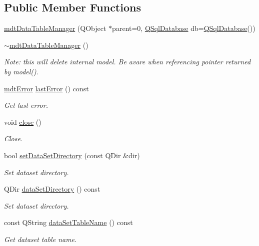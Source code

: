 \subsection*{Public Member Functions}
\begin{DoxyCompactItemize}
\item 
\hyperlink{classmdt_data_table_manager_ae63e559f597ae48a36e149afde3a8396}{mdt\-Data\-Table\-Manager} (Q\-Object $\ast$parent=0, \hyperlink{class_q_sql_database}{Q\-Sql\-Database} db=\hyperlink{class_q_sql_database}{Q\-Sql\-Database}())
\item 
\hyperlink{classmdt_data_table_manager_a3a1c225b1aeedad8fc89b126147971ca}{$\sim$mdt\-Data\-Table\-Manager} ()
\begin{DoxyCompactList}\small\item\em Note\-: this will delete internal model. Be avare when referencing pointer returned by model(). \end{DoxyCompactList}\item 
\hyperlink{classmdt_error}{mdt\-Error} \hyperlink{classmdt_data_table_manager_aaeff001bf9a44f890078f5c6f434ec05}{last\-Error} () const 
\begin{DoxyCompactList}\small\item\em Get last error. \end{DoxyCompactList}\item 
void \hyperlink{classmdt_data_table_manager_a368e82d3128e0c5098e09a9555bd65aa}{close} ()
\begin{DoxyCompactList}\small\item\em Close. \end{DoxyCompactList}\item 
bool \hyperlink{classmdt_data_table_manager_a1e19b3f34c1b0a91bcae4396731efc57}{set\-Data\-Set\-Directory} (const Q\-Dir \&dir)
\begin{DoxyCompactList}\small\item\em Set dataset directory. \end{DoxyCompactList}\item 
Q\-Dir \hyperlink{classmdt_data_table_manager_a8fa0924a76e8f3fec9617f690cc4e148}{data\-Set\-Directory} () const 
\begin{DoxyCompactList}\small\item\em Set dataset directory. \end{DoxyCompactList}\item 
const Q\-String \hyperlink{classmdt_data_table_manager_affcbb25ab7308527885c4f3f703e7440}{data\-Set\-Table\-Name} () const 
\begin{DoxyCompactList}\small\item\em Get dataset table name. \end{DoxyCompactList}\item 

\end{DoxyCompactItemize}
